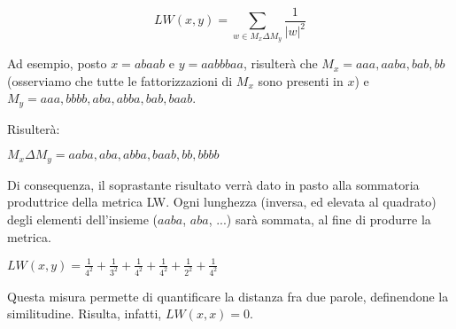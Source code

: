 \[LW (x, y)=\sum_{w \in M_x \Delta M_y} \frac{1}{|w|^2 }\]

Ad esempio, posto $x=abaab$ e $y=aabbbaa$, risulterà che $M_x=aaa, aaba, bab, bb$ (osserviamo che tutte le fattorizzazioni di $M_x$ sono presenti in $x$) e $M_y=aaa,bbbb,aba,abba,bab,baab$.

\vspace{3mm}

Risulterà:

\vspace{3mm}

\(M_x \Delta M_y ={aaba,aba,abba,baab,bb,bbbb}\)

\vspace{3mm}

Di consequenza, il soprastante risultato verrà dato in pasto alla sommatoria produttrice della metrica LW. Ogni lunghezza (inversa, ed elevata al quadrato) degli elementi dell'insieme ($aaba$, $aba$, ...) sarà sommata, al fine di produrre la metrica.

\(LW(x,y) = \frac{1}{4^2}+\frac{1}{3^2}+\frac{1}{4^2}+\frac{1}{4^2}+\frac{1}{2^2}+\frac{1}{4^2}\)

Questa misura permette di quantificare la distanza fra due parole, definendone la similitudine. Risulta, infatti, $LW(x,x)=0$. 
